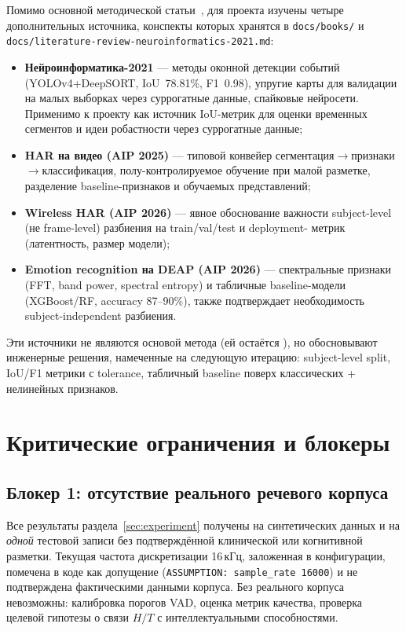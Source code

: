 \documentclass[12pt,a4paper]{article}
\begin{document}
Помимо основной методической статьи~\cite{kuzenkov2014}, для проекта
изучены четыре дополнительных источника, конспекты которых хранятся в
\texttt{docs/books/} и \texttt{docs/literature-review-neuroinformatics-2021.md}:

\begin{itemize}
  \item \textbf{Нейроинформатика-2021} — методы оконной детекции событий
   (YOLOv4+DeepSORT, IoU~78.81\%, F1~0.98), упругие карты для валидации на
   малых выборках через суррогатные данные, спайковые нейросети. Применимо
   к проекту как источник IoU-метрик для оценки временных сегментов и идеи
   робастности через суррогатные данные;
  \item \textbf{HAR на видео (AIP 2025)} — типовой конвейер
   сегментация$\to$признаки$\to$классификация, полу-контролируемое обучение
   при малой разметке, разделение baseline-признаков и обучаемых
   представлений;
  \item \textbf{Wireless HAR (AIP 2026)} — явное обоснование важности
   subject-level (не frame-level) разбиения на train/val/test и deployment-
   метрик (латентность, размер модели);
  \item \textbf{Emotion recognition на DEAP (AIP 2026)} — спектральные
   признаки (FFT, band power, spectral entropy) и табличные baseline-модели
   (XGBoost/RF, accuracy 87--90\%), также подтверждает необходимость
   subject-independent разбиения.
\end{itemize}

Эти источники не являются основой метода (ей остаётся
\cite{kuzenkov2014}), но обосновывают инженерные решения, намеченные на
следующую итерацию: subject-level split, IoU/F1 метрики с tolerance,
табличный baseline поверх классических + нелинейных признаков.

\section{Критические ограничения и блокеры}
\label{sec:blockers}

\subsection{Блокер 1: отсутствие реального речевого корпуса}

Все результаты раздела~\ref{sec:experiment} получены на синтетических
данных и на \emph{одной} тестовой записи без подтверждённой клинической или
когнитивной разметки. Текущая частота дискретизации 16\,кГц, заложенная в
конфигурации, помечена в коде как допущение
(\texttt{ASSUMPTION: sample\_rate 16000}) и не подтверждена фактическими
данными корпуса. Без реального корпуса невозможны: калибровка порогов VAD,
оценка метрик качества, проверка целевой гипотезы о связи $H/T$ с
интеллектуальными способностями.
\end{document}
